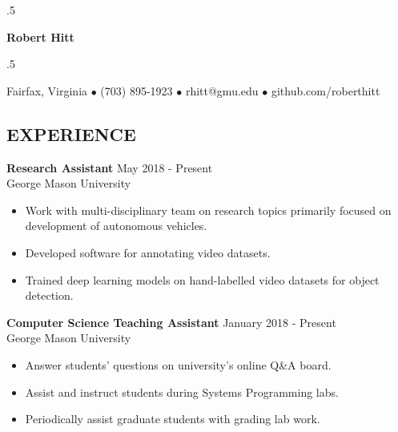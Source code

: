 \documentclass[11pt]{res} %
\begin{document}

\moveleft.5\hoffset\centerline{\large\bf Robert Hitt} %

\moveleft.5\hoffset\centerline{Fairfax, Virginia  $\bullet$  (703) 895-1923  $\bullet$  rhitt@gmu.edu  $\bullet$  github.com/roberthitt}

\vspace{-15pt}
\noindent\makebox[\linewidth]{\rule{\textwidth}{1pt}}


\begin{resume}


\vspace{-22pt}\section{EXPERIENCE} \smallskip

\textbf{Research Assistant} \hfill May 2018 - Present \\
George Mason University\smallskip
\begin{itemize}
\item Work with multi-disciplinary team on research topics primarily focused on development of autonomous vehicles.
\item Developed software for annotating video datasets.
\item Trained deep learning models on hand-labelled video datasets for object detection.
\end{itemize}

\vspace{-8pt}\textbf{Computer Science Teaching Assistant} \hfill January 2018 - Present \\
George Mason University\smallskip
\begin{itemize}
\item Answer students' questions on university's online Q\&A board.
\item Assist and instruct students during Systems Programming labs.
\item Periodically assist graduate students with grading lab work.
\end{itemize}


\end{resume}
\end{document}
